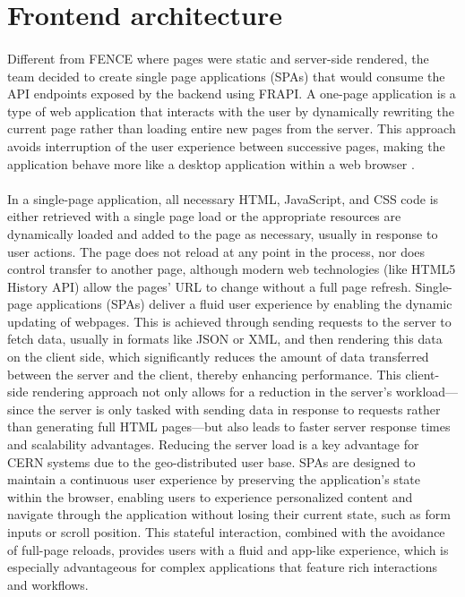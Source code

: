 \section{Frontend architecture}
\paragraph{} Different from FENCE where pages were static and server-side rendered, the team decided to create single page applications (SPAs) that would consume the API endpoints exposed by the backend using FRAPI. A one-page application is a type of web application that interacts with the user by dynamically rewriting the current page rather than loading entire new pages from the server. This approach avoids interruption of the user experience between successive pages, making the application behave more like a desktop application within a web browser \cite{Adobe2023SPAs}.

\paragraph{} In a single-page application, all necessary HTML, JavaScript, and CSS code is either retrieved with a single page load or the appropriate resources are dynamically loaded and added to the page as necessary, usually in response to user actions. The page does not reload at any point in the process, nor does control transfer to another page, although modern web technologies (like HTML5 History API) allow the pages' URL to change without a full page refresh. Single-page applications (SPAs) deliver a fluid user experience by enabling the dynamic updating of webpages. This is achieved through sending requests to the server to fetch data, usually in formats like JSON or XML, and then rendering this data on the client side, which significantly reduces the amount of data transferred between the server and the client, thereby enhancing performance. This client-side rendering approach not only allows for a reduction in the server's workload—since the server is only tasked with sending data in response to requests rather than generating full HTML pages—but also leads to faster server response times and scalability advantages. Reducing the server load is a key advantage for CERN systems due to the geo-distributed user base. SPAs are designed to maintain a continuous user experience by preserving the application's state within the browser, enabling users to experience personalized content and navigate through the application without losing their current state, such as form inputs or scroll position. This stateful interaction, combined with the avoidance of full-page reloads, provides users with a fluid and app-like experience, which is especially advantageous for complex applications that feature rich interactions and workflows.

